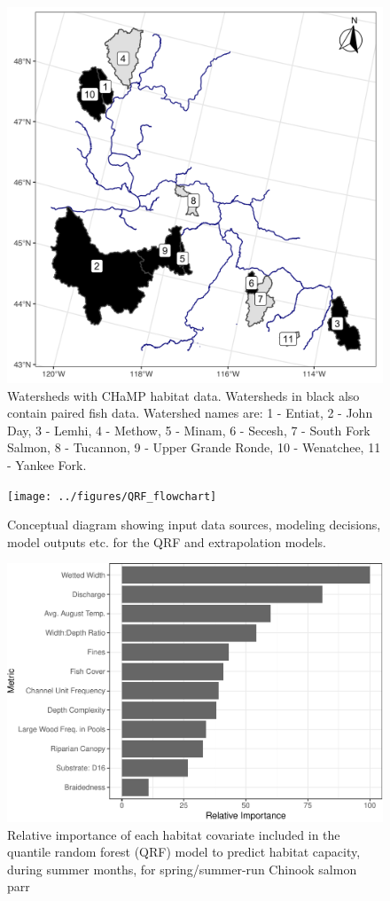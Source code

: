 \documentclass[
  12pt,
]{article}
\begin{document}
\hypertarget{figures}{}

\begin{figure}
\includegraphics[width=0.85\linewidth]{../figures/ChampWtds} \caption{Watersheds with CHaMP habitat data. Watersheds in black also contain paired fish data. Watershed names are: 1 - Entiat, 2 - John Day, 3 - Lemhi, 4 - Methow, 5 - Minam, 6 - Secesh, 7 - South Fork Salmon, 8 - Tucannon, 9 - Upper Grande Ronde, 10 - Wenatchee, 11 - Yankee Fork.}\label{fig:wtsd-map}
\end{figure}

\newpage

\begin{figure}
\texttt{[image: ../figures/QRF\_flowchart]} \caption{Conceptual diagram showing input data sources, modeling decisions, model outputs etc. for the QRF and extrapolation models.}\label{fig:model-diag}
\end{figure}

\newpage

\begin{figure}
\centering
\includegraphics{../figures/rel-imp-figure-1.pdf}
\caption{\label{fig:rel-imp-figure}Relative importance of each habitat covariate included in the quantile random forest (QRF) model to predict habitat capacity, during summer months, for spring/summer-run Chinook salmon parr}
\end{figure}
\end{document}
